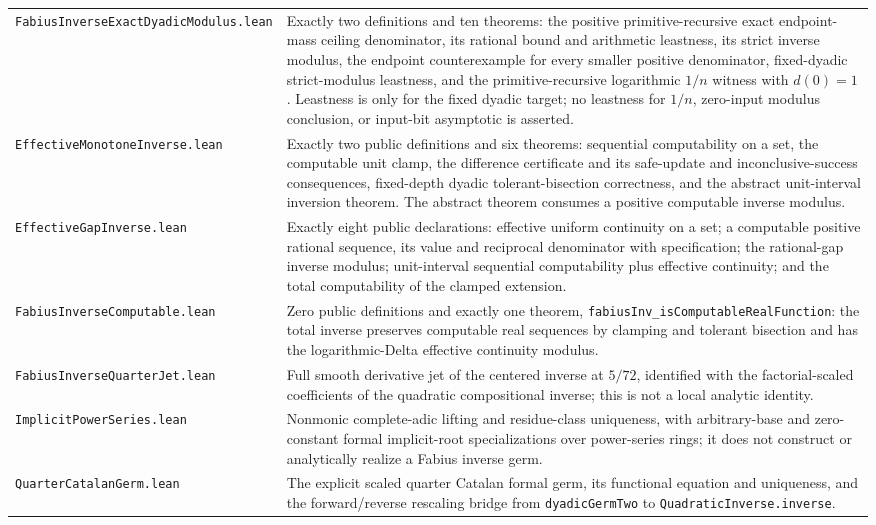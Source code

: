 \documentclass[11pt,oneside]{article}
\theoremstyle{definition}
\theoremstyle{remark}
\begin{document}
\begin{longtable}{>{\raggedright\arraybackslash}p{} >{\raggedright\arraybackslash}p{}}
\nolinkurl{FabiusInverseExactDyadicModulus.lean} & Exactly two definitions and ten theorems: the positive primitive-recursive exact endpoint-mass ceiling denominator, its rational bound and arithmetic leastness, its strict inverse modulus, the endpoint counterexample for every smaller positive denominator, fixed-dyadic strict-modulus leastness, and the primitive-recursive logarithmic \(1/n\) witness with \(d(0)=1\).  Leastness is only for the fixed dyadic target; no leastness for \(1/n\), zero-input modulus conclusion, or input-bit asymptotic is asserted. \\
\nolinkurl{EffectiveMonotoneInverse.lean} & Exactly two public definitions and six theorems: sequential computability on a set, the computable unit clamp, the difference certificate and its safe-update and inconclusive-success consequences, fixed-depth dyadic tolerant-bisection correctness, and the abstract unit-interval inversion theorem.  The abstract theorem consumes a positive computable inverse modulus. \\
\nolinkurl{EffectiveGapInverse.lean} & Exactly eight public declarations: effective uniform continuity on a set; a computable positive rational sequence, its value and reciprocal denominator with specification; the rational-gap inverse modulus; unit-interval sequential computability plus effective continuity; and the total computability of the clamped extension. \\
\nolinkurl{FabiusInverseComputable.lean} & Zero public definitions and exactly one theorem, \nolinkurl{fabiusInv_isComputableRealFunction}: the total inverse preserves computable real sequences by clamping and tolerant bisection and has the logarithmic-Delta effective continuity modulus. \\
\nolinkurl{FabiusInverseQuarterJet.lean} & Full smooth derivative jet of the centered inverse at \(5/72\), identified with the factorial-scaled coefficients of the quadratic compositional inverse; this is not a local analytic identity. \\
\nolinkurl{ImplicitPowerSeries.lean} & Nonmonic complete-adic lifting and residue-class uniqueness, with arbitrary-base and zero-constant formal implicit-root specializations over power-series rings; it does not construct or analytically realize a Fabius inverse germ. \\
\nolinkurl{QuarterCatalanGerm.lean} & The explicit scaled quarter Catalan formal germ, its functional equation and uniqueness, and the forward/reverse rescaling bridge from \nolinkurl{dyadicGermTwo} to \nolinkurl{QuadraticInverse.inverse}. \\

\end{longtable}
\end{document}

